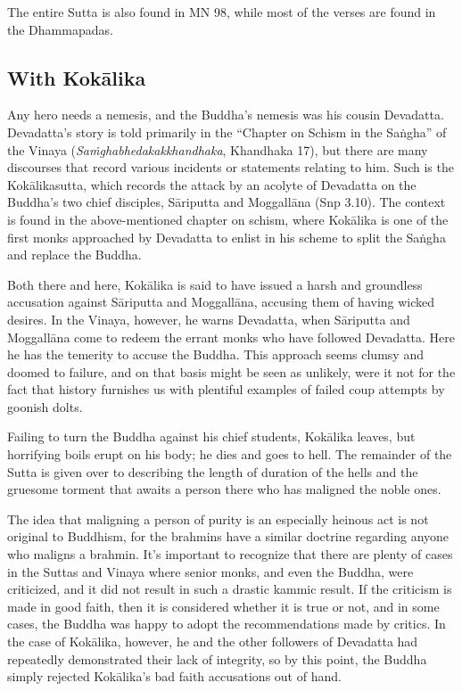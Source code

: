 \documentclass[12pt,openany]{book}%
\begin{document}
The entire Sutta is also found in MN 98, while most of the verses are found in the Dhammapadas.

\subsection*{With \textsanskrit{Kokālika}}

Any hero needs a nemesis, and the Buddha’s nemesis was his cousin Devadatta. Devadatta’s story is told primarily in the “Chapter on Schism in the \textsanskrit{Saṅgha}” of the Vinaya (\textit{\textsanskrit{Saṁghabhedakakkhandhaka}}, Khandhaka 17), but there are many discourses that record various incidents or statements relating to him. Such is the \textsanskrit{Kokālikasutta}, which records the attack by an acolyte of Devadatta on the Buddha’s two chief disciples, \textsanskrit{Sāriputta} and \textsanskrit{Moggallāna} (Snp 3.10). The context is found in the above-mentioned chapter on schism, where \textsanskrit{Kokālika} is one of the first monks approached by Devadatta to enlist in his scheme to split the \textsanskrit{Saṅgha} and replace the Buddha.

Both there and here, \textsanskrit{Kokālika} is said to have issued a harsh and groundless accusation against \textsanskrit{Sāriputta} and \textsanskrit{Moggallāna}, accusing them of having wicked desires. In the Vinaya, however, he warns Devadatta, when \textsanskrit{Sāriputta} and \textsanskrit{Moggallāna} come to redeem the errant monks who have followed Devadatta. Here he has the temerity to accuse the Buddha. This approach seems clumsy and doomed to failure, and on that basis might be seen as unlikely, were it not for the fact that history furnishes us with plentiful examples of failed coup attempts by goonish dolts.

Failing to turn the Buddha against his chief students, \textsanskrit{Kokālika} leaves, but horrifying boils erupt on his body; he dies and goes to hell. The remainder of the Sutta is given over to describing the length of duration of the hells and the gruesome torment that awaits a person there who has maligned the noble ones.

The idea that maligning a person of purity is an especially heinous act is not original to Buddhism, for the brahmins have a similar doctrine regarding anyone who maligns a brahmin. It’s important to recognize that there are plenty of cases in the Suttas and Vinaya where senior monks, and even the Buddha, were criticized, and it did not result in such a drastic kammic result. If the criticism is made in good faith, then it is considered whether it is true or not, and in some cases, the Buddha was happy to adopt the recommendations made by critics. In the case of \textsanskrit{Kokālika}, however, he and the other followers of Devadatta had repeatedly demonstrated their lack of integrity, so by this point, the Buddha simply rejected \textsanskrit{Kokālika}’s bad faith accusations out of hand.
\end{document}
